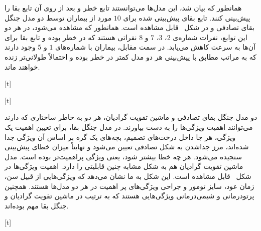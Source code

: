 همانطور که بیان شد، این مدل‌ها می‌توانستند تابع خطر و بعد از روی آن تابع بقا را پیش‌بینی کنند. تابع بقای پیش‌بینی شده برای $10$ مورد از بیماران توسط دو مدل جنگل بقای تصادفی و  در شکل~ قابل مشاهده است. همانطور که مشاهده می‌شود، در هر دو این توابع، نفرات شماره‌ی $2$، $3$، $7$ و $8$ نفراتی هستند که در خطر بوده و تابع بقا برای آن‌ها به سرعت کاهش می‌یابد. در سمت مقابل، بیماران با شماره‌های $1$ و $5$ وجود دارند که به مراتب مطابق با پیش‌بینی هر دو مدل کمتر در خطر بوده و احتمالاً طولانی‌تر زنده خواهند ماند.

[t]\centering


[t]\centering


دو مدل جنگل بقای تصادفی و ماشین تقویت گرادیان، هر دو به خاطر ساختاری که دارند می‌توانند اهمیت ویژگی‌ها را به دست بیاورند. در مدل جنگل بقا، برای تعیین اهمیت یک ویژگی، هر جا داخل درخت‌های تصمیم، بچه‌های یک گره بر اساس آن ویژگی جدا شده‌اند، مرز جداشدن به شکل تصادفی تعیین می‌شود و نهایتاً‌ میزان خطای پیش‌بینی  سنجیده می‌شود. هر چه خطا بیشتر شود، یعنی ویژگی‌ پراهمیت‌تر بوده است. مدل ماشین تقویت گرادیان هم به شکل مشابه چنین قابلیتی را دارد. اهمیت ویژگی‌ها در شکل~ قابل مشاهده است. این شکل به ما نشان می‌دهد که ویژگی‌هایی از قبیل سن، زمان عود، سایز تومور و  جراحی ویژگی‌های پر اهمیت در هر دو مدل‌ها هستند. همچنین پرتو‌درمانی و شیمی‌درمانی ویژگی‌هایی هستند که به ترتیب در ماشین تقویت گرادیان و جنگل بقا مهم بوده‌اند.

[t]\centering


